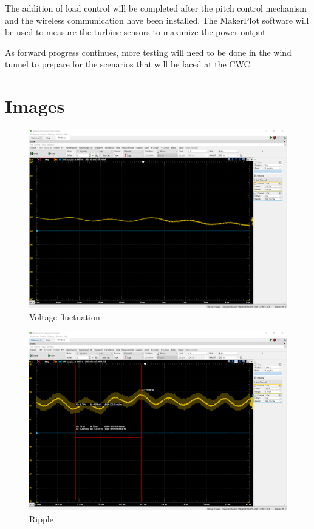 \documentclass[11pt,letterpaper,conference]{IEEEtran}
\begin{document}
The addition of load control will be completed after the pitch control mechanism and the wireless communication have been installed. The MakerPlot software will be used to measure the turbine sensors to maximize the power output.

As forward progress continues, more testing will need to be done in the wind tunnel to prepare for the scenarios that will be faced at the CWC.
\balance

\raggedright
\printbibliography

\clearpage
\onecolumn
\appendices
\section{Images}
\label{apx:images}

\FloatBarrier
\begin{figure}[th]
    \centering
    \includegraphics[width=\textwidth]{images/osc_voltage.png}
    \caption{Voltage fluctuation}
    \label{img:osc_voltage}
\end{figure}
\begin{figure}[th]
    \centering
    \includegraphics[width=\textwidth]{images/osc_ripple.png}
    \caption{Ripple}
    \label{img:osc_ripple}
\end{figure}
\end{document}
